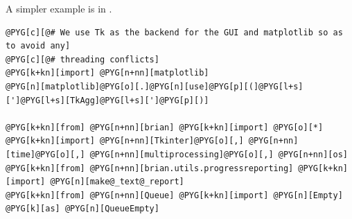 \documentclass[letterpaper,10pt,english]{manual}
\begin{document}
A simpler example is in .

\begin{Verbatim}[commandchars=@\[\]]
@PYG[c][@# We use Tk as the backend for the GUI and matplotlib so as to avoid any]
@PYG[c][@# threading conflicts]
@PYG[k+kn][import] @PYG[n+nn][matplotlib]
@PYG[n][matplotlib]@PYG[o][.]@PYG[n][use]@PYG[p][(]@PYG[l+s][']@PYG[l+s][TkAgg]@PYG[l+s][']@PYG[p][)]

@PYG[k+kn][from] @PYG[n+nn][brian] @PYG[k+kn][import] @PYG[o][*]
@PYG[k+kn][import] @PYG[n+nn][Tkinter]@PYG[o][,] @PYG[n+nn][time]@PYG[o][,] @PYG[n+nn][multiprocessing]@PYG[o][,] @PYG[n+nn][os]
@PYG[k+kn][from] @PYG[n+nn][brian.utils.progressreporting] @PYG[k+kn][import] @PYG[n][make@_text@_report]
@PYG[k+kn][from] @PYG[n+nn][Queue] @PYG[k+kn][import] @PYG[n][Empty] @PYG[k][as] @PYG[n][QueueEmpty]



\end{Verbatim}
\end{document}
